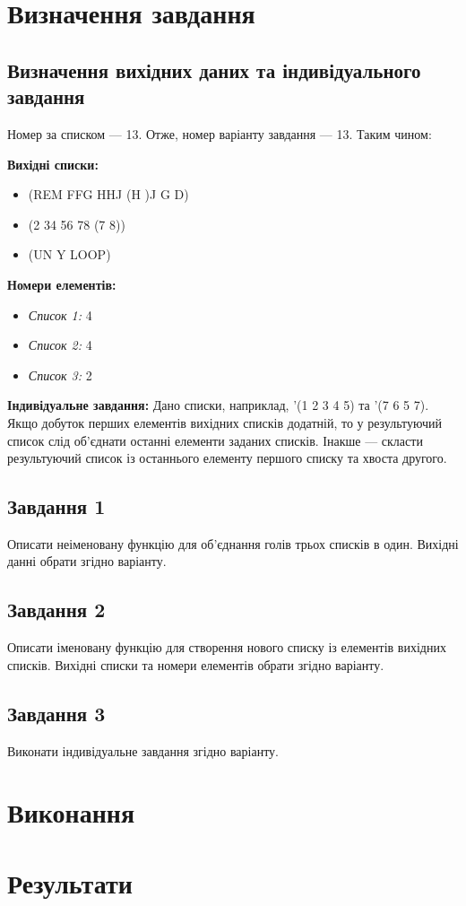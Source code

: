 \documentclass[a4paper, 12pt]{extarticle}
\begin{document}
\section{Визначення завдання}
\subsection{Визначення вихідних даних та індивідуального завдання}
Номер за списком --- 13. Отже, номер варіанту завдання --- 13.
Таким чином:

\textbf{Вихідні списки:}
\begin{itemize}
  \item (REM FFG HHJ (H )J G D)
  \item (2 34 56 78 (7 8))
  \item (UN Y LOOP)
\end{itemize}

\textbf{Номери елементів:}
\begin{itemize}
  \item \textit{Список 1:} 4
  \item \textit{Список 2:} 4
  \item \textit{Список 3:} 2
\end{itemize}

\textbf{Індивідуальне завдання:}
Дано списки, наприклад, '(1 2 3 4 5) та '(7 6 5 7). Якщо добуток перших елементів вихідних списків додатній, то у результуючий список слід об'єднати останні елементи заданих списків. Інакше --- скласти результуючий список із останнього елементу першого списку та хвоста другого.

\subsection{Завдання 1}
Описати неіменовану функцію для об'єднання голів трьох списків в один. Вихідні данні обрати згідно варіанту.

\subsection{Завдання 2}
Описати іменовану функцію для створення нового списку із елементів вихідних списків. Вихідні списки та номери елементів обрати згідно варіанту.

\subsection{Завдання 3}
Виконати індивідуальне завдання згідно варіанту.

\section{Виконання}






\section{Результати}
\end{document}
